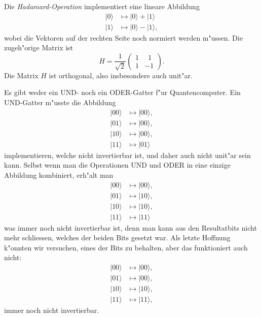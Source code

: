 \begin{beispiel}
Die {\em Hadamard-Operation} implementiert eine lineare Abbildung
\begin{align*}
|0\rangle &\mapsto |0\rangle + |1\rangle\\
|1\rangle &\mapsto |0\rangle - |1\rangle,
\end{align*}
wobei die Vektoren auf der rechten Seite noch normiert werden m"ussen.
Die zugeh"orige Matrix ist
\[
H=
\frac1{\sqrt{2}}
\begin{pmatrix}
1&\phantom{1}1\\
1&-1
\end{pmatrix}.
\]
Die Matrix $H$ ist orthogonal, also insbesondere auch unit"ar.
\end{beispiel}

\begin{beispiel}
Es gibt weder ein UND- noch ein ODER-Gatter f"ur Quantencomputer.
Ein UND-Gatter m"usste die Abbildung
\begin{align*}
|00\rangle&\mapsto|00\rangle,\\
|01\rangle&\mapsto|00\rangle,\\
|10\rangle&\mapsto|00\rangle,\\
|11\rangle&\mapsto|01\rangle
\end{align*}
implementieren, welche nicht invertierbar ist, und daher auch nicht
unit"ar sein kann.
Selbst wenn man die Operationen UND und ODER in eine einzige Abbildung
kombiniert, erh"alt man
\begin{align*}
|00\rangle&\mapsto|00\rangle,\\
|01\rangle&\mapsto|10\rangle,\\
|10\rangle&\mapsto|10\rangle,\\
|11\rangle&\mapsto|11\rangle
\end{align*}
was immer noch nicht invertierbar ist, denn man kann aus den Resultatbits
nicht mehr schliessen, welches der beiden Bits gesetzt war.
Als letzte Hoffnung k"onnten wir versuchen, eines der Bits zu behalten,
aber das funktioniert auch nicht:
\begin{align*}
|00\rangle&\mapsto|00\rangle,\\
|01\rangle&\mapsto|00\rangle,\\
|10\rangle&\mapsto|10\rangle,\\
|11\rangle&\mapsto|11\rangle,
\end{align*}
immer noch nicht invertierbar.
\end{beispiel}

